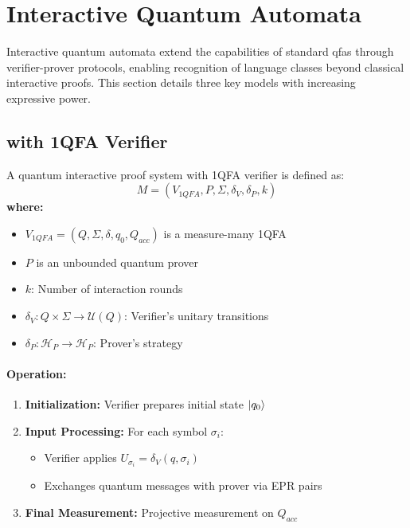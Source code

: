 \section{Interactive Quantum Automata}
\label{sec:interactive-quantum}

Interactive quantum automata extend the capabilities of standard \glspl{qfa} through verifier-prover protocols, enabling recognition of language classes beyond classical interactive proofs. This section details three key models with increasing expressive power.

\subsection{ with 1QFA Verifier}
\label{subsec:qip1qfa}

\begin{definition}
A quantum interactive proof system with 1QFA verifier is defined as:
\[
M = (V_{1QFA}, P, \Sigma, \delta_V, \delta_P, k)
\]
\textbf{where:}
\begin{itemize}
    \item $V_{1QFA} = (Q, \Sigma, \delta, q_0, Q_{acc})$ is a measure-many 1QFA
    \item $P$ is an unbounded quantum prover
    \item $k$: Number of interaction rounds
    \item $\delta_V: Q \times \Sigma \rightarrow \mathcal{U}(Q)$: Verifier's unitary transitions
    \item $\delta_P: \mathcal{H}_P \rightarrow \mathcal{H}_P$: Prover's strategy
\end{itemize}
\end{definition}

\paragraph{Operation:}
\begin{enumerate}
    \item \textbf{Initialization:} Verifier prepares initial state $\ket{q_0}$
    \item \textbf{Input Processing:} For each symbol $\sigma_i$:
    \begin{itemize}
        \item Verifier applies $U_{\sigma_i} = \delta_V(q, \sigma_i)$
        \item Exchanges quantum messages with prover via EPR pairs
    \end{itemize}
    \item \textbf{Final Measurement:} Projective measurement on $Q_{acc}$
\end{enumerate}

